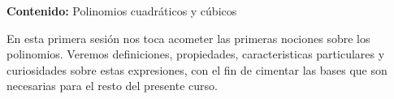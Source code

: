 {\Large
    \textbf{Contenido:} Polinomios cuadráticos y cúbicos
}

En esta primera sesión nos toca acometer las primeras nociones sobre los polinomios.
Veremos definiciones, propiedades, caracteristicas particulares y curiosidades sobre
estas expresiones, con el fin de cimentar las bases que son necesarias para el resto
del presente curso.